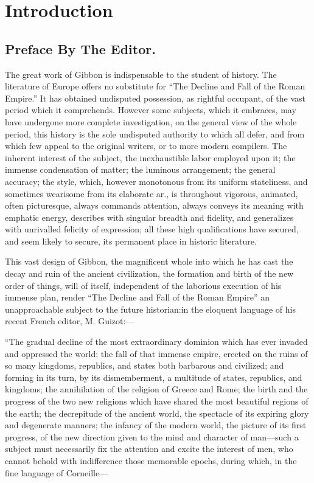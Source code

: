 \section{Introduction}
\subsection{Preface By The Editor.}

The great work of Gibbon is indispensable to the student of history. The literature of Europe offers no substitute for “The Decline and Fall of the Roman Empire.” It has obtained undisputed possession, as rightful occupant, of the vast period which it comprehends. However some subjects, which it embraces, may have undergone more complete investigation, on the general view of the whole period, this history is the sole undisputed authority to which all defer, and from which few appeal to the original writers, or to more modern compilers. The inherent interest of the subject, the inexhaustible labor employed upon it; the immense condensation of matter; the luminous arrangement; the general accuracy; the style, which, however monotonous from its uniform stateliness, and sometimes wearisome from its elaborate ar., is throughout vigorous, animated, often picturesque, always commands attention, always conveys its meaning with emphatic energy, describes with singular breadth and fidelity, and generalizes with unrivalled felicity of expression; all these high qualifications have secured, and seem likely to secure, its permanent place in historic literature.

This vast design of Gibbon, the magnificent whole into which he has cast the decay and ruin of the ancient civilization, the formation and birth of the new order of things, will of itself, independent of the laborious execution of his immense plan, render “The Decline and Fall of the Roman Empire” an unapproachable subject to the future historian:\footnotemark[101] in the eloquent language of his recent French editor, M. Guizot:—


“The gradual decline of the most extraordinary dominion which has ever invaded and oppressed the world; the fall of that immense empire, erected on the ruins of so many kingdoms, republics, and states both barbarous and civilized; and forming in its turn, by its dismemberment, a multitude of states, republics, and kingdoms; the annihilation of the religion of Greece and Rome; the birth and the progress of the two new religions which have shared the most beautiful regions of the earth; the decrepitude of the ancient world, the spectacle of its expiring glory and degenerate manners; the infancy of the modern world, the picture of its first progress, of the new direction given to the mind and character of man—such a subject must necessarily fix the attention and excite the interest of men, who cannot behold with indifference those memorable epochs, during which, in the fine language of Corneille—

